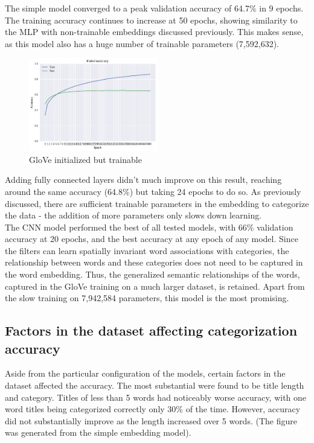 \documentclass[jou,apacite, 10px]{apa6}
\begin{document}
The simple model converged to a peak validation accuracy of 64.7\% in 9 epochs. The training accuracy continues to increase at 50 epochs, showing similarity to the MLP with non-trainable embeddings discussed previously. This makes sense, as this model also has a huge number of trainable parameters (7,592,632).\\

\begin{figure}[h!]
\captionsetup{justification=centering}
    \centering
     \includegraphics[width=0.5\textwidth]{images/Training-GloveTrainable}
        \caption{GloVe initialized but trainable}
\end{figure}

Adding fully connected layers didn't much improve on this result, reaching around the same accuracy (64.8\%) but taking 24 epochs to do so. As previously discussed, there are sufficient trainable parameters in the embedding to categorize the data - the addition of more parameters only slows down learning.\\

The CNN model performed the best of all tested models, with 66\% validation accuracy at 20 epochs, and the best accuracy at any epoch of any model. Since the filters can learn spatially invariant word associations with categories, the relationship between words and these categories does not need to be captured in the word embedding. Thus, the generalized semantic relationships of the words, captured in the GloVe training on a much larger dataset, is retained. Apart from the slow training on 7,942,584 parameters, this model is the most promising.\\

\subsection{Factors in the dataset affecting categorization accuracy}
Aside from the particular configuration of the models, certain factors in the dataset affected the accuracy. The most substantial were found to be title length and category. Titles of less than 5 words had noticeably worse accuracy, with one word titles being categorized correctly only 30\% of the time. However, accuracy did not substantially improve as the length increased over 5 words. (The figure was generated from the simple embedding model).\\
\end{document}
